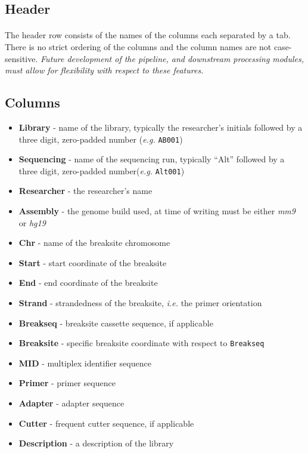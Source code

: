\documentclass{article}
\begin{document}
\subsection{Header}
\paragraph{} The header row consists of the names of the columns each separated by a tab. There is no strict ordering of the columns and the column names are not case-sensitive. \emph {Future development of the pipeline, and downstream processing modules, must allow for flexibility with respect to these features.}

\subsection{Columns}
\begin{itemize}
  \item \textbf{Library} - name of the library, typically the researcher's initials followed by a three digit, zero-padded number (\emph{e.g.} \texttt{AB001})
  \item \textbf{Sequencing} - name of the sequencing run, typically ``Alt'' followed by a three digit, zero-padded number(\emph{e.g.} \texttt{Alt001})
  \item \textbf{Researcher} - the researcher's name
  \item \textbf{Assembly} - the genome build used, at time of writing must be either \emph{mm9} or \emph{hg19}
  \item \textbf{Chr} - name of the breaksite chromosome
  \item \textbf{Start} - start coordinate of the breaksite
  \item \textbf{End} - end coordinate of the breaksite
  \item \textbf{Strand} - strandedness of the breaksite, \emph{i.e.} the primer orientation
  \item \textbf{Breakseq} - breaksite cassette sequence, if applicable
  \item \textbf{Breaksite} - specific breaksite coordinate with respect to \texttt{Breakseq} 
  \item \textbf{MID} - multiplex identifier sequence
  \item \textbf{Primer} - primer sequence
  \item \textbf{Adapter} - adapter sequence
  \item \textbf{Cutter} - frequent cutter sequence, if applicable
  \item \textbf{Description} - a description of the library
\end{itemize}
\end{document}
